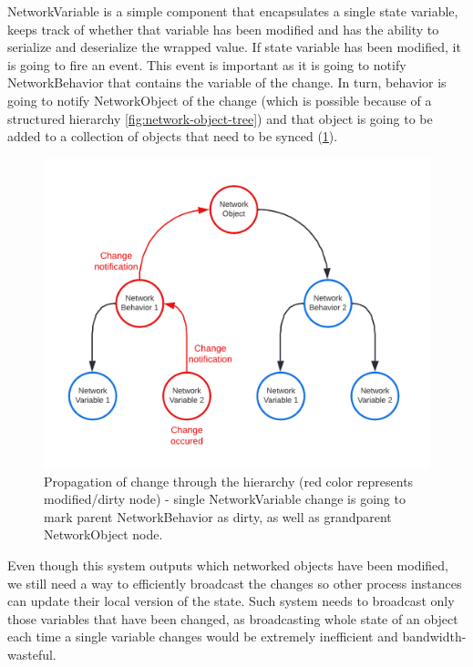 \documentclass[times, utf8, diplomski]{fer}
\begin{document}
NetworkVariable is a simple component that encapsulates a single state variable, keeps track of whether that variable has been modified and has the ability to serialize and deserialize the wrapped value. If state variable has been modified, it is going to fire an event. This event is important as it is going to notify NetworkBehavior that contains the variable of the change. In turn, behavior is going to notify NetworkObject of the change (which is possible because of a structured hierarchy \ref{fig:network-object-tree}) and that object is going to be added to a collection of objects that need to be synced (\ref{fig:network-object-propagation}).

\begin{figure}[H]
	\centering
	\includegraphics[scale=0.3]{NetworkObject-propagation-of-change}
	\caption{Propagation of change through the hierarchy (red color represents modified/dirty node) - single NetworkVariable change is going to mark parent NetworkBehavior as dirty, as well as grandparent NetworkObject node.}
	\label{fig:network-object-propagation}
\end{figure}

Even though this system outputs which networked objects have been modified, we still need a way to efficiently broadcast the changes so other process instances can update their local version of the state. Such system needs to broadcast only those variables that have been changed, as broadcasting whole state of an object each time a single variable changes would be extremely inefficient and bandwidth-wasteful.\\
\end{document}
